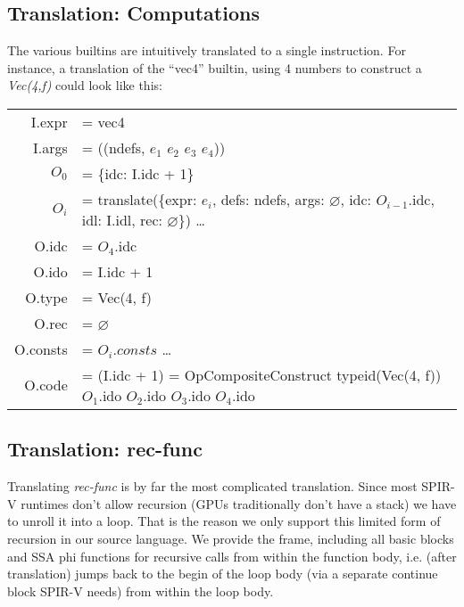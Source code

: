 \documentclass[letterpaper,12pt]{article}
\begin{document}
\subsection{Translation: Computations}

The various builtins are intuitively translated to a single instruction.
For instance, a translation of the ``vec4'' builtin, using
4 numbers to construct a \textit{Vec(4,f)} could look like this:

\medskip
\begin{tabularx}{\linewidth}{rl}
	I.expr &= vec4 \\
	I.args &= ((ndefs, $e_1$ $e_2$ $e_3$ $e_4$)) \\
	$O_0$ &= \{idc: I.idc + 1\} \\
	$O_i$ &= translate(\{expr: $e_i$, defs: ndefs, args: $\varnothing$, idc: $O_{i - 1}$.idc, idl: I.idl, rec: $\varnothing$\}) \dots \\
	O.idc &= $O_4$.idc \\
	O.ido &= I.idc + 1 \\
	O.type &= Vec(4, f) \\
	O.rec &= $\varnothing$ \\
	O.consts &= $O_i.consts$ \dots \\
	O.code &= (I.idc + 1) = OpCompositeConstruct typeid(Vec(4, f)) $O_1$.ido $O_2$.ido $O_3$.ido $O_4$.ido \\
\end{tabularx}

\newpage
\subsection{Translation: rec-func}

Translating \textit{rec-func} is by far the most complicated translation.
Since most SPIR-V runtimes don't allow recursion (GPUs traditionally
don't have a stack) we have to unroll it into a loop. That is the reason
we only support this limited form of recursion in our source language.
We provide the frame, including all basic blocks and SSA phi functions
for recursive calls from within the function body, i.e. (after translation)
jumps back to the begin of the loop body (via a separate continue block SPIR-V needs)
from within the loop body.
\end{document}
